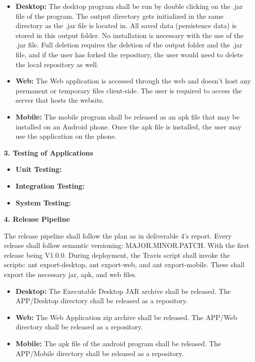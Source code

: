 \documentclass[12pt]{article}
\begin{document}
\begin{itemize}
	\item \textbf{Desktop:} The desktop program shall be run by double clicking on the .jar file of the program. The output directory gets initialized in the same directory as the .jar file is located in. All saved data (persistence data) is stored in this output folder. No installation is necessary with the use of the .jar file. Full deletion requires the deletion of the output folder and the .jar file, and if the user has forked the repository, the user would need to delete the local repository as well.
	
	\item \textbf{Web:} The Web application is accessed through the web and doesn't host any permanent or temporary files client-side. The user is required to access the server that hosts the website.
	
	\item \textbf{Mobile:} The mobile program shall be released as an apk file that may be installed on an Android phone. Once the apk file is installed, the user may use the application on the phone. 
\end{itemize}

\textbf{3. Testing of Applications}


\begin{itemize}
	\item \textbf{Unit Testing:}
	\item \textbf{Integration Testing:}
	\item \textbf{System Testing:}
\end{itemize}

\textbf{4. Release Pipeline}


The release pipeline shall follow the plan as in deliverable 4's report. Every release shall follow semantic versioning: MAJOR.MINOR.PATCH. With the first release being V1.0.0. During deployment, the Travis script shall invoke the scripts: ant export-desktop, ant export-web, and ant export-mobile. These shall export the necessary jar, apk, and web files.
\begin{itemize}
	\item \textbf{Desktop:} The Executable Desktop JAR archive shall be released. The APP/Desktop directory shall be released as a repository.
	\item \textbf{Web:} The Web Application zip archive shall be released. The APP/Web directory shall be released as a repository.
	\item \textbf{Mobile:} The apk file of the android program shall be released. The APP/Mobile directory shall be released as a repository.
\end{itemize}
\end{document}
